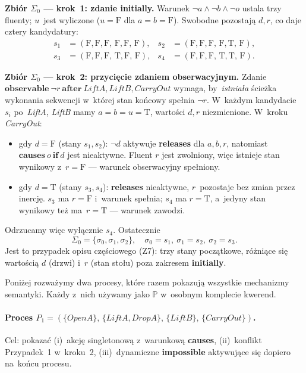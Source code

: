 \documentclass[11pt,a4paper]{article}
\newcommand{\causes}{\textbf{causes}}
\newcommand{\aft}{\textbf{after}}
\renewcommand{\iff}{\textbf{if}}
\newcommand{\initially}{\textbf{initially}}
\newcommand{\impossible}{\textbf{impossible}}
\newcommand{\releases}{\textbf{releases}}
\newcommand{\observable}{\textbf{observable}}
\theoremstyle{definition}
\begin{document}
\medskip
\noindent\textbf{Zbiór $\Sigma_0$ --- krok~1: zdanie \initially{}.}
Warunek $\neg a \land \neg b \land \neg o$ ustala trzy fluenty;
$u$~jest wyliczone ($u = \text{F}$ dla $a = b = \text{F}$).
Swobodne pozostają $d, r$, co daje cztery kandydatury:
\begin{align*}
  s_1 &= (\text{F},\text{F},\text{F},\,\text{F},\text{F},\,\text{F}), &
  s_2 &= (\text{F},\text{F},\text{F},\,\text{F},\text{T},\,\text{F}), \\
  s_3 &= (\text{F},\text{F},\text{F},\,\text{T},\text{F},\,\text{F}), &
  s_4 &= (\text{F},\text{F},\text{F},\,\text{T},\text{T},\,\text{F}).
\end{align*}

\medskip
\noindent\textbf{Zbiór $\Sigma_0$ --- krok~2: przycięcie zdaniem obserwacyjnym.}
Zdanie $\observable\ \neg r\ \aft\ \mathit{LiftA}, \mathit{LiftB}, \mathit{CarryOut}$
wymaga, by~\emph{istniała} ścieżka wykonania sekwencji w~której stan końcowy
spełnia $\neg r$. W~każdym kandydacie $s_i$ po~\textit{LiftA}, \textit{LiftB}
mamy $a = b = u = \text{T}$, wartości $d, r$ niezmienione. W~kroku \textit{CarryOut}:
\begin{itemize}[topsep=2pt]
  \item gdy $d = \text{F}$ (stany $s_1, s_2$): $\neg d$ aktywuje \releases{}
        dla $a, b, r$, natomiast $\causes\ o\ \iff\ d$ jest nieaktywne.
        Fluent $r$ jest zwolniony, więc istnieje stan wynikowy z~$r = \text{F}$
        --- warunek obserwacyjny spełniony.
  \item gdy $d = \text{T}$ (stany $s_3, s_4$): \releases{} nieaktywne,
        $r$~pozostaje bez zmian przez inercję.
        $s_3$ ma $r = \text{F}$ i~warunek spełnia; $s_4$ ma $r = \text{T}$,
        a~jedyny stan wynikowy też ma~$r = \text{T}$ --- warunek zawodzi.
\end{itemize}
Odrzucamy więc wyłącznie $s_4$. Ostatecznie
\[
  \Sigma_0 = \{\sigma_0, \sigma_1, \sigma_2\}, \quad
  \sigma_0 = s_1,\ \sigma_1 = s_2,\ \sigma_2 = s_3.
\]
Jest to przypadek opisu częściowego (Z7): trzy stany początkowe, różniące
się wartością $d$ (drzwi) i~$r$ (stan stołu) poza zakresem \initially{}.

\medskip
\noindent Poniżej rozważymy dwa procesy, które razem pokazują wszystkie
mechanizmy semantyki. Każdy z~nich używamy jako $\mathbb{P}$ w~osobnym
komplecie kwerend.

\paragraph{Proces $P_1 = (\{\mathit{OpenA}\},\, \{\mathit{LiftA}, \mathit{DropA}\},\,
\{\mathit{LiftB}\},\, \{\mathit{CarryOut}\})$.}
Cel: pokazać (i)~akcję singletonową z~warunkową \causes{},
(ii)~konflikt Przypadek~1 w~kroku~2,
(iii)~dynamiczne \impossible{} aktywujące się dopiero na~końcu procesu.
\end{document}
